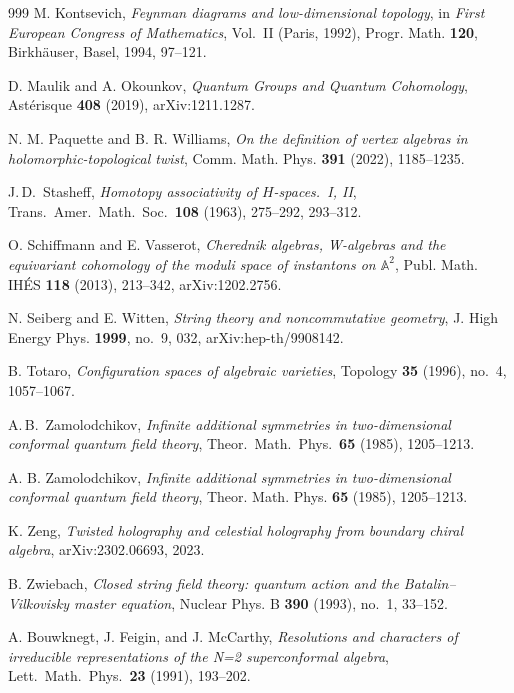 \documentclass[11pt]{memoir}
\begin{document}
\begin{thebibliography}{999}
M. Kontsevich, \emph{Feynman diagrams and low-dimensional topology}, in \emph{First European Congress of Mathematics}, Vol.~II (Paris, 1992), Progr. Math. \textbf{120}, Birkh\"auser, Basel, 1994, 97--121.

D. Maulik and A. Okounkov, \emph{Quantum Groups and Quantum Cohomology}, Ast\'erisque \textbf{408} (2019), arXiv:1211.1287.

N. M. Paquette and B. R. Williams, \emph{On the definition of vertex algebras in holomorphic-topological twist}, Comm. Math. Phys. \textbf{391} (2022), 1185--1235.

 J.\,D.~Stasheff, \emph{Homotopy associativity of $H$-spaces.~I, II}, Trans.\ Amer.\ Math.\ Soc.\ \textbf{108} (1963), 275--292, 293--312.

O. Schiffmann and E. Vasserot, \emph{Cherednik algebras, W-algebras and the equivariant cohomology of the moduli space of instantons on $\mathbb{A}^2$}, Publ. Math. IH\'ES \textbf{118} (2013), 213--342, arXiv:1202.2756.

N. Seiberg and E. Witten, \emph{String theory and noncommutative geometry}, J. High Energy Phys. \textbf{1999}, no.~9, 032, arXiv:hep-th/9908142.

B. Totaro, \emph{Configuration spaces of algebraic varieties}, Topology \textbf{35} (1996), no.~4, 1057--1067.

A.\,B.~Zamolodchikov, \emph{Infinite additional symmetries in two-dimensional conformal quantum field theory}, Theor.\ Math.\ Phys.\ \textbf{65} (1985), 1205--1213.

A. B. Zamolodchikov, \emph{Infinite additional symmetries in two-dimensional conformal quantum field theory}, Theor. Math. Phys. \textbf{65} (1985), 1205--1213.

K. Zeng, \emph{Twisted holography and celestial holography from boundary chiral algebra}, arXiv:2302.06693, 2023.

B. Zwiebach, \emph{Closed string field theory: quantum action and the Batalin--Vilkovisky master equation}, Nuclear Phys. B \textbf{390} (1993), no.~1, 33--152.



A. Bouwknegt, J. Feigin, and J. McCarthy, \emph{Resolutions and characters of irreducible representations of the N=2 superconformal algebra}, Lett.\ Math.\ Phys.\ \textbf{23} (1991), 193--202.



\end{thebibliography}
\end{document}

